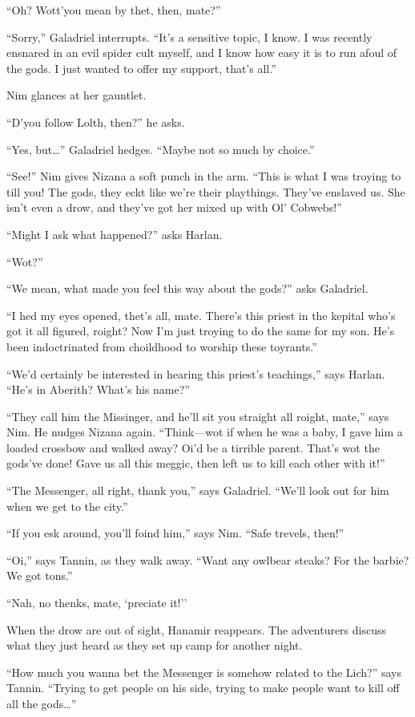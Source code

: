 \documentclass[smalldemyvopaper,11pt,twoside,onecolumn,openright,extrafontsizes]{memoir}
\begin{document}
``Oh? Wott'you mean by thet, then, mate?''

``Sorry,'' Galadriel interrupts. ``It's a sensitive topic, I know. I was
recently ensnared in an evil spider cult myself, and I know how easy it
is to run afoul of the gods. I just wanted to offer my support, that's
all.''

Nim glances at her gauntlet.

``D'you follow Lolth, then?'' he asks.

``Yes, but\ldots{}'' Galadriel hedges. ``Maybe not so much by choice.''

``See!'' Nim gives Nizana a soft punch in the arm. ``This is what I was
troying to till you! The gods, they eckt like we're their playthings.
They've enslaved us. She isn't even a drow, and they've got her mixed up
with Ol' Cobwebs!''

``Might I ask what happened?'' asks Harlan.

``Wot?''

``We mean, what made you feel this way about the gods?'' asks Galadriel.

``I hed my eyes opened, thet's all, mate. There's this priest in the
kepital who's got it all figured, roight? Now I'm just troying to do the
same for my son. He's been indoctrinated from choildhood to worship
these toyrants.''

``We'd certainly be interested in hearing this priest's teachings,''
says Harlan. ``He's in Aberith? What's his name?''

``They call him the Missinger, and he'll sit you straight all roight,
mate,'' says Nim. He nudges Nizana again. ``Think---wot if when he was a
baby, I gave him a loaded crossbow and walked away? Oi'd be a tirrible
parent. That's wot the gods've done! Gave us all this meggic, then left
us to kill each other with it!''

``The Messenger, all right, thank you,'' says Galadriel. ``We'll look
out for him when we get to the city.''

``If you esk around, you'll foind him,'' says Nim. ``Safe trevels,
then!''

``Oi,'' says Tannin, as they walk away. ``Want any owlbear steaks? For
the barbie? We got tons.''

``Nah, no thenks, mate, `preciate it!''

When the drow are out of sight, Hanamir reappears. The adventurers
discuss what they just heard as they set up camp for another night.

``How much you wanna bet the Messenger is somehow related to the Lich?''
says Tannin. ``Trying to get people on his side, trying to make people
want to kill off all the gods\ldots{}''
\end{document}
